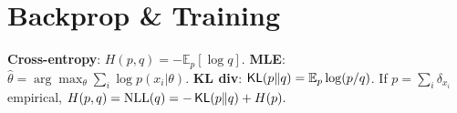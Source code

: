 \section{Backprop \& Training}
\textbf{Cross-entropy}: \(H(p, q)=-\mathbb{E}_{p}[\log q]\).
\textbf{MLE}: \(\hat{\theta} = \arg\max_\theta \sum_{i}\log p(x_i|\theta)\).
\textbf{KL div}: \(\operatorname{\mathsf{KL}}(p\|q)=\mathbb{E}_{p}\log(p/q)\).
If \(p=\sum_i\delta_{x_i}\) empirical, \(H(p, q) = \mathrm{NLL}(q) = - \operatorname{\mathsf{KL}}(p\|q) + H(p).\)
